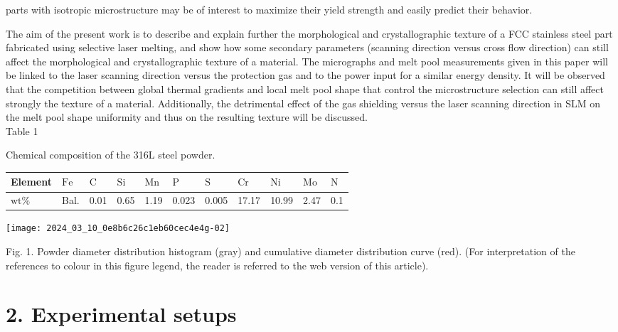 \documentclass[10pt]{article}
\begin{document}
parts with isotropic microstructure may be of interest to maximize their yield strength and easily predict their behavior.

The aim of the present work is to describe and explain further the morphological and crystallographic texture of a FCC stainless steel part fabricated using selective laser melting, and show how some secondary parameters (scanning direction versus cross flow direction) can still affect the morphological and crystallographic texture of a material. The micrographs and melt pool measurements given in this paper will be linked to the laser scanning direction versus the protection gas and to the power input for a similar energy density. It will be observed that the competition between global thermal gradients and local melt pool shape that control the microstructure selection can still affect strongly the texture of a material. Additionally, the detrimental effect of the gas shielding versus the laser scanning direction in SLM on the melt pool shape uniformity and thus on the resulting texture will be discussed.\\
Table 1

Chemical composition of the 316L steel powder.

\begin{center}
\begin{tabular}{lllllllllll}
\hline
Element & $\mathrm{Fe}$ & $\mathrm{C}$ & $\mathrm{Si}$ & $\mathrm{Mn}$ & $\mathrm{P}$ & $\mathrm{S}$ & $\mathrm{Cr}$ & $\mathrm{Ni}$ & $\mathrm{Mo}$ & $\mathrm{N}$ \\
\hline
$\mathrm{wt} \%$ & Bal. & 0.01 & 0.65 & 1.19 & 0.023 & 0.005 & 17.17 & 10.99 & 2.47 & 0.1 \\
\hline
\end{tabular}
\end{center}

\begin{center}
\texttt{[image: 2024\_03\_10\_0e8b6c26c1eb60cec4e4g-02]}
\end{center}

Fig. 1. Powder diameter distribution histogram (gray) and cumulative diameter distribution curve (red). (For interpretation of the references to colour in this figure legend, the reader is referred to the web version of this article).

\section*{2. Experimental setups}
\end{document}
